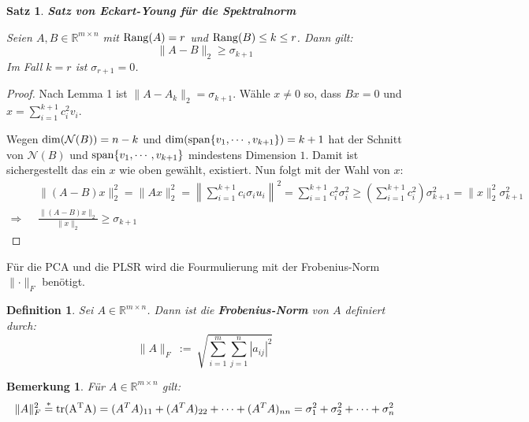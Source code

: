 \documentclass{article}
\newcommand{\R}[0]{\mathbb{R}}
\newtheorem{defin}{Definition}
\newtheorem{bem}{Bemerkung}
\newtheorem{thm}{Satz}
\begin{document}
\begin{thm} \textbf{Satz von Eckart-Young für die Spektralnorm}

    Seien $A, B \in \R^{m \times n}$ mit ${\rm Rang}(A) = r$ und ${\rm Rang}(B) \leq k \leq r$. Dann gilt:
    \begin{equation}
        \lVert A - B \rVert_2 \geq \sigma_{k+1}
    \end{equation}
    Im Fall $k = r$ ist $\sigma_{r+1} = 0$.
\end{thm}

\begin{proof} \cite[S. 72f.]{strang2019linear}
    Nach Lemma 1 ist $\lVert A - A_k \rVert_2 = \sigma_{k+1}$. Wähle $x \neq 0$ so, dass $Bx = 0$ und $x = \sum\limits_{i=1}^{k+1} c_i^2v_i$.

    Wegen ${\rm dim}(\mathcal{N}(B)) = n - k$ und ${\rm dim}({\rm span}\{v_1, \cdots, v_{k+1}\}) = k + 1$ hat der Schnitt von $\mathcal{N}(B)$ und ${\rm span}\{v_1, \cdots, v_{k+1}\}$ mindestens Dimension $1$. 
    Damit ist sichergestellt das ein $x$ wie oben gewählt, existiert. Nun folgt mit der Wahl von $x$:
    \begin{align*}
        &\lVert(A-B)x\rVert_2^2 = \lVert Ax \rVert^2_2 = \left\lVert \sum\limits_{i=1}^{k+1} c_i\sigma_i u_i \right\rVert^2 = \sum\limits_{i=1}^{k+1}c_i^2\sigma_i^2 \geq \left(\sum\limits_{i=1}^{k+1}c_i^2\right)\sigma_{k+1}^2 = \lVert x \rVert_2^2 \sigma_{k+1}^2 \\
    \Rightarrow \:\:\: &\frac{\lVert (A - B)x \rVert_2}{\lVert x \rVert_2} \geq \sigma_{k+1}
    \end{align*}
\end{proof}

Für die PCA und die PLSR wird die Fourmulierung mit der Frobenius-Norm $\lVert \cdot \rVert_F$ benötigt.

\begin{defin}
    Sei $A \in \R^{m \times n}$. Dann ist die \textbf{Frobenius-Norm} von $A$ definiert durch:
    \begin{equation}
        \lVert A \rVert_F \: := \: \sqrt{\sum_{i=1}^{m}\sum_{j=1}^{n} |a_{ij}|^2}
    \end{equation}
\end{defin}

\begin{bem}
    Für $A \in \R^{m \times n}$ gilt:
    \begin{equation}
        \lVert A \rVert_F^2 \overset{*}{=} {\rm tr(A^TA)} = (A^TA)_{11} + (A^TA)_{22} + \cdots + (A^TA)_{nn} = \sigma_1^2 + \sigma_2^2 + \cdots + \sigma_n^2        
    \end{equation}
\end{bem}
\end{document}
